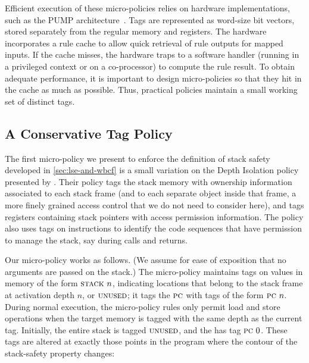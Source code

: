 \documentclass[acmsmall,review,anonymous]{acmart}\settopmatter{printfolios=true,printccs=false,printacmref=false}
\begin{document}
Efficient execution of these micro-policies relies on hardware implementations,
such as the PUMP architecture~\citep{pump:asplos2015}.  Tags are represented
as word-size bit vectors, stored separately from the regular memory and registers.
The hardware incorporates a rule cache
to allow quick retrieval of rule outputs for mapped inputs. If the cache misses,
the hardware traps to a software handler (running in a privileged context or
on a co-processor) to compute the rule result. To obtain adequate performance,
it is important to design micro-policies so that they hit in the cache as
much as possible. Thus, practical policies maintain a small working set of
distinct tags.

\subsection{A Conservative Tag Policy}
\label{sec:conservative}
%
The first micro-policy we present to enforce the definition of stack
safety developed in \cref{sec:lse-and-wbcf} is a small variation
on the Depth Isolation policy presented by
\citet{DBLP:conf/sp/RoesslerD18}. Their policy tags the stack memory
with ownership information associated to each stack frame (and to each
separate object inside that frame, a more finely grained access
control that we do not need to consider here), and tags registers containing
stack pointers with access permission information. The policy also
uses tags on instructions to identify the code
sequences that have permission to manage the stack, say during calls and returns.

Our micro-policy works as follows. (We assume for ease of exposition that no
arguments are passed on the stack.)
The micro-policy maintains tags on values in memory of the form $\textsc{stack} ~ n$,
indicating locations that belong to the stack frame at activation depth $n$,
or $\textsc{unused}$; it tags the $\textsc{pc}$ with tags of the form $\textsc{pc} ~ n$.
During normal execution, the micro-policy rules only permit load and store operations
when the target memory is tagged with the same depth as the current {\PCname} tag.
Initially, the entire stack is tagged $\textsc{unused}$,
and the {\PCname} has tag $\textsc{pc} ~ 0$. These tags are altered
at exactly those points in
the program where the contour of the stack-safety property changes:
\end{document}
